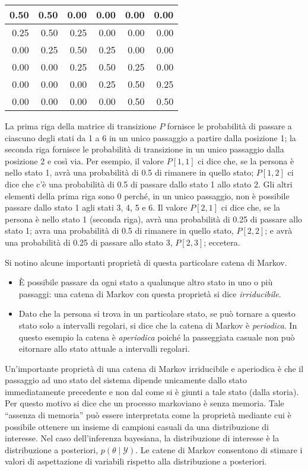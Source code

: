 \documentclass[
]{memoir}
\providecommand{\tightlist}{%
  \setlength{\itemsep}{0pt}\setlength{\parskip}{0pt}}
\begin{document}
\begin{tabular}{r|r|r|r|r|r}
\hline
0.50 & 0.50 & 0.00 & 0.00 & 0.00 & 0.00\\
\hline
0.25 & 0.50 & 0.25 & 0.00 & 0.00 & 0.00\\
\hline
0.00 & 0.25 & 0.50 & 0.25 & 0.00 & 0.00\\
\hline
0.00 & 0.00 & 0.25 & 0.50 & 0.25 & 0.00\\
\hline
0.00 & 0.00 & 0.00 & 0.25 & 0.50 & 0.25\\
\hline
0.00 & 0.00 & 0.00 & 0.00 & 0.50 & 0.50\\
\hline
\end{tabular}

\hfill\break

La prima riga della matrice di transizione \(P\) fornisce le probabilità di passare a ciascuno degli stati da 1 a 6 in un unico passaggio a partire dalla posizione 1; la seconda riga fornisce le probabilità di transizione in un unico passaggio dalla posizione 2 e così via. Per esempio, il valore \(P[1, 1]\) ci dice che, se la persona è nello stato 1, avrà una probabilità di 0.5 di rimanere in quello stato; \(P[1, 2]\) ci dice che c'è una probabilità di 0.5 di passare dallo stato 1 allo stato 2. Gli altri elementi della prima riga sono 0 perché, in un unico passaggio, non è possibile passare dallo stato 1 agli stati 3, 4, 5 e 6. Il valore \(P[2, 1]\) ci dice che, se la persona è nello stato 1 (seconda riga), avrà una probabilità di 0.25 di passare allo stato 1; avra una probabilità di 0.5 di rimanere in quello stato, \(P[2, 2]\); e avrà una probabilità di 0.25 di passare allo stato 3, \(P[2, 3]\); eccetera.

Si notino alcune importanti proprietà di questa particolare catena di Markov.

\begin{itemize}
\tightlist
\item
  È possibile passare da ogni stato a qualunque altro stato in uno o più passaggi: una catena di Markov con questa proprietà si dice \emph{irriducibile}.
\item
  Dato che la persona si trova in un particolare stato, se può tornare a questo stato solo a intervalli regolari, si dice che la catena di Markov è \emph{periodica}. In questo esempio la catena è \emph{aperiodica} poiché la passeggiata casuale non può eitornare allo stato attuale a intervalli regolari.
\end{itemize}

Un'importante proprietà di una catena di Markov irriducibile e aperiodica è che il passaggio ad uno stato del sistema dipende unicamente dallo stato immediatamente precedente e non dal come si è giunti a tale stato (dalla storia). Per questo motivo si dice che un processo markoviano è senza memoria. Tale ``assenza di memoria'' può essere interpretata come la proprietà mediante cui è possibile ottenere un insieme di campioni casuali da una distribuzione di interesse. Nel caso dell'inferenza bayesiana, la distribuzione di interesse è la distribuzione a posteriori, \(p(\theta \mid \mathcal{Y})\). Le catene di Markov consentono di stimare i valori di aspettazione di variabili rispetto alla distribuzione a posteriori.
\end{document}
